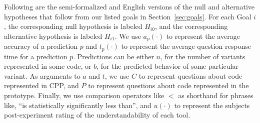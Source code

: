 \documentclass[11pt]{article}
\begin{document}
Following are the semi-formalized and English versions of the null and
alternative hypotheses that follow from our listed goals in
Section~\ref{sec:goals}.  For each Goal $i$, the corresponding null hypothesis
is labeled $H_{i0}$, and the corresponding alternative hypothesis is labeled
$H_{i1}$.  We use $a_p(\cdot)$ to represent the average accuracy of a
prediction $p$ and $t_p(\cdot)$ to represent the average question response time
for a prediction $p$.  Predictions can be either $n$, for the number of
variants represented in some code, or $b$, for the predicted behavior of some
particular variant.  As arguments to $a$ and $t$, we use $C$ to represent
questions about code represented in CPP, and $P$ to represent questions about
code represented in the prototype.  Finally, we use comparison operators like
$<$ as shorthand for phrases like, ``is statistically significantly less
than'', and $u(\cdot)$ to represent the subjects post-experiment rating of the
understandability of each tool.
\end{document}
